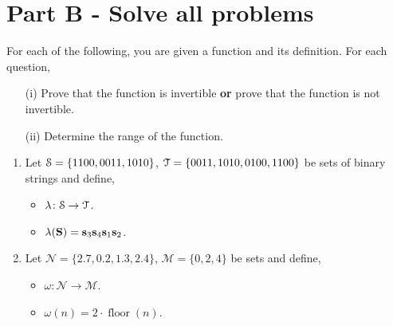 \documentclass[12pt]{article} %
\begin{document}
\newpage

\section*{Part B - Solve all problems}

\begin{qstn}
  For each of the following, you are given a function and its definition. For each question,
  \begin{enumerate}[label=(\alph*)]
    \item[(i)] Prove that the function is invertible \textbf{or} prove that the function is not invertible.
    \item[(ii)] Determine the range of the function.
  \end{enumerate}

  \begin{enumerate}[label=(\alph*)]
  \item Let $\EuScript{S} = \{1100,0011,1010\} $, $\EuScript{T} = \{0011,1010,0100,1100\}$ be sets of binary
    strings and define,
    \begin{itemize}
      \item $\lambda \colon \EuScript{S} \to \EuScript{T}$.
      \item $\lambda(\textbf{S}) = \vb s_3\vb s_4\vb s_1 \vb s_2$.
  \end{itemize}


    \vspace*{7cm}



  \item Let $\mathcal{N} = \{2.7,0.2,1.3,2.4\} $, $\mathcal{M} = \{0,2,4\}$ be sets and define,
    \begin{itemize}
      \item $\omega \colon \mathcal{N} \to \mathcal{M}$.
      \item $\omega(n) = 2\cdot \operatorname{floor}(n)$.
    \end{itemize}
  \end{enumerate}

\end{qstn}

\newpage
\end{document}

